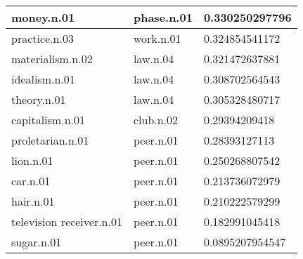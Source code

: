 \begin{center}
\begin{tabular}{ | l | l | l |}
money.n.01 & phase.n.01 & 0.330250297796\\ \hline
practice.n.03 & work.n.01 & 0.324854541172\\ \hline
materialism.n.02 & law.n.04 & 0.321472637881\\ \hline
idealism.n.01 & law.n.04 & 0.308702564543\\ \hline
theory.n.01 & law.n.04 & 0.305328480717\\ \hline
capitalism.n.01 & club.n.02 & 0.29394209418\\ \hline
proletarian.n.01 & peer.n.01 & 0.28393127113\\ \hline
lion.n.01 & peer.n.01 & 0.250268807542\\ \hline
car.n.01 & peer.n.01 & 0.213736072979\\ \hline
hair.n.01 & peer.n.01 & 0.210222579299\\ \hline
television receiver.n.01 & peer.n.01 & 0.182991045418\\ \hline
sugar.n.01 & peer.n.01 & 0.0895207954547\\ \hline
\end{tabular}
\end{center}